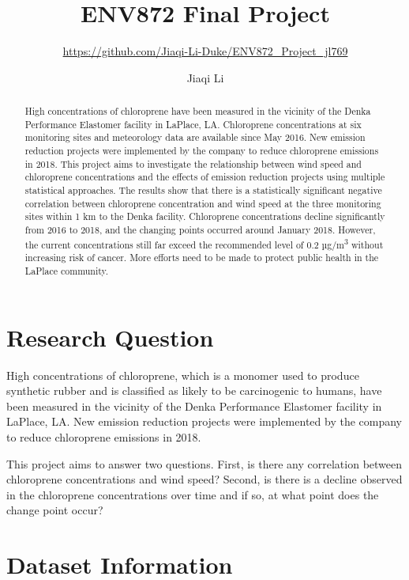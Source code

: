 \documentclass[12pt,]{article}
\title{ENV872 Final Project}
\subtitle{\url{https://github.com/Jiaqi-Li-Duke/ENV872_Project_jl769}}
\author{Jiaqi Li}
\date{}
\begin{document}
\maketitle
\begin{abstract}
High concentrations of chloroprene have been measured in the vicinity of
the Denka Performance Elastomer facility in LaPlace, LA. Chloroprene
concentrations at six monitoring sites and meteorology data are
available since May 2016. New emission reduction projects were
implemented by the company to reduce chloroprene emissions in 2018. This
project aims to investigate the relationship between wind speed and
chloroprene concentrations and the effects of emission reduction
projects using multiple statistical approaches. The results show that
there is a statistically significant negative correlation between
chloroprene concentration and wind speed at the three monitoring sites
within 1 km to the Denka facility. Chloroprene concentrations decline
significantly from 2016 to 2018, and the changing points occurred around
January 2018. However, the current concentrations still far exceed the
recommended level of 0.2 µg/m\textsuperscript{3} without increasing risk
of cancer. More efforts need to be made to protect public health in the
LaPlace community.
\end{abstract}

\newpage

\tableofcontents  \newpage
\listoftables  \newpage
\listoffigures  \newpage

\section{Research Question}\label{research-question}

High concentrations of chloroprene, which is a monomer used to produce
synthetic rubber and is classified as likely to be carcinogenic to
humans, have been measured in the vicinity of the Denka Performance
Elastomer facility in LaPlace, LA. New emission reduction projects were
implemented by the company to reduce chloroprene emissions in 2018.

This project aims to answer two questions. First, is there any
correlation between chloroprene concentrations and wind speed? Second,
is there is a decline observed in the chloroprene concentrations over
time and if so, at what point does the change point occur?

\newpage

\section{Dataset Information}\label{dataset-information}
\end{document}
